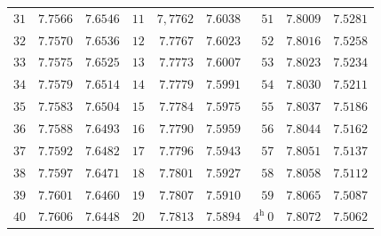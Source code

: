 \begin{center}
\begin{tabular}{r|r|r||r|r|r||r|r|r}
$31$ & $7.7566$ & $7.6546$ & $11$ & $7{,}7762$ & $7.6038$ & $51$ & $7.8009$ & $7.5281$\\
$32$ & $7.7570$ & $7.6536$ & $12$ & $7.7767$ & $7.6023$ & $52$ & $7.8016$ & $7.5258$\\
$33$ & $7.7575$ & $7.6525$ & $13$ & $7.7773$ & $7.6007$ & $53$ & $7.8023$ & $7.5234$\\
$34$ & $7.7579$ & $7.6514$ & $14$ & $7.7779$ & $7.5991$ & $54$ & $7.8030$ & $7.5211$\\
$35$ & $7.7583$ & $7.6504$ & $15$ & $7.7784$ & $7.5975$ & $55$ & $7.8037$ & $7.5186$\\
$36$ & $7.7588$ & $7.6493$ & $16$ & $7.7790$ & $7.5959$ & $56$ & $7.8044$ & $7.5162$\\
$37$ & $7.7592$ & $7.6482$ & $17$ & $7.7796$ & $7.5943$ & $57$ & $7.8051$ & $7.5137$\\
$38$ & $7.7597$ & $7.6471$ & $18$ & $7.7801$ & $7.5927$ & $58$ & $7.8058$ & $7.5112$\\
$39$ & $7.7601$ & $7.6460$ & $19$ & $7.7807$ & $7.5910$ & $59$ & $7.8065$ & $7.5087$\\
$40$ & $7.7606$ & $7.6448$ & $20$ & $7.7813$ & $7.5894$ & $4^{\mathrm h}\ 0$ & $7.8072$ & $7.5062$\\
\end{tabular}

\endgroup
\end{center}
\clearpage{}%
